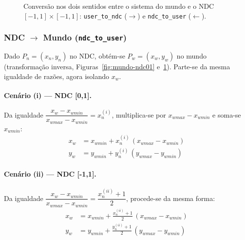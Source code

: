 \begin{figure}[H]
    \centering
    \mapafig{\presetmundo}{\presetndcii}
    \caption{Conversão nos dois sentidos entre o sistema do mundo e o NDC $[-1,1] \times [-1,1]$: \texttt{user\_to\_ndc} ($\rightarrow$) e \texttt{ndc\_to\_user} ($\leftarrow$).}
    \label{fig:mundo-ndc11}
\end{figure}

\subsubsection{\texorpdfstring{NDC $\rightarrow$ Mundo}{NDC -> Mundo} (\texttt{ndc\_to\_user})}
Dado $P_n = (x_n, y_n)$ no NDC, obtém-se $P_w = (x_w, y_w)$ no mundo (transformação inversa, Figuras~\ref{fig:mundo-ndc01} e~\ref{fig:mundo-ndc11}). Parte-se da mesma igualdade de razões, agora isolando $x_w$.

\paragraph{Cenário (i) --- NDC [0,1].} Da igualdade $\dfrac{x_w - x_{wmin}}{x_{wmax} - x_{wmin}} = x_n^{(i)}$, multiplica-se por $x_{wmax} - x_{wmin}$ e soma-se $x_{wmin}$:
\begin{equation}
    \boxed{\begin{aligned}
        x_w &= x_{wmin} + x_n^{(i)} \, (x_{wmax} - x_{wmin}) \\
        y_w &= y_{wmin} + y_n^{(i)} \, (y_{wmax} - y_{wmin})
    \end{aligned}}
    \label{eq:ndc-user-i}
\end{equation}

\paragraph{Cenário (ii) --- NDC [-1,1].} Da igualdade $\dfrac{x_w - x_{wmin}}{x_{wmax} - x_{wmin}} = \dfrac{x_n^{(ii)} + 1}{2}$, procede-se da mesma forma:
\begin{equation}
    \boxed{\begin{aligned}
        x_w &= x_{wmin} + \frac{x_n^{(ii)} + 1}{2} \, (x_{wmax} - x_{wmin}) \\[2mm]
        y_w &= y_{wmin} + \frac{y_n^{(ii)} + 1}{2} \, (y_{wmax} - y_{wmin})
    \end{aligned}}
    \label{eq:ndc-user-ii}
\end{equation}

